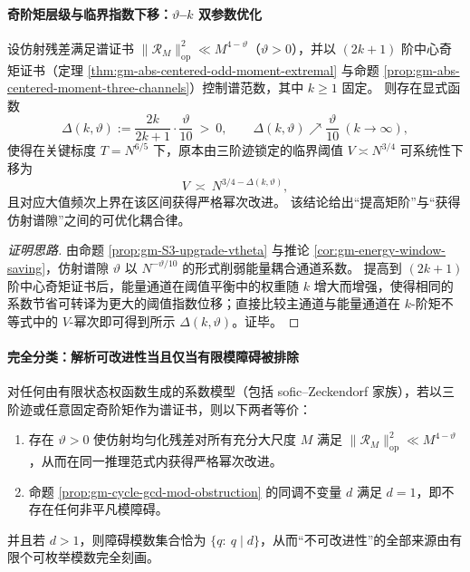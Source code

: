 \paragraph{奇阶矩层级与临界指数下移：\texorpdfstring{$\vartheta$}{vtheta}--\texorpdfstring{$k$}{k} 双参数优化}
\begin{proposition}\label{prop:gm-critical-exponent-shift-k-vtheta}
设仿射残差满足谱证书
\(
\|\mathcal{R}_M\|_{\mathrm{op}}^2\ll M^{4-\vartheta}
\)（\(\vartheta>0\)），并以 \((2k+1)\) 阶中心奇矩证书（定理 \ref{thm:gm-abs-centered-odd-moment-extremal} 与命题 \ref{prop:gm-abs-centered-moment-three-channels}）控制谱范数，其中 \(k\ge 1\) 固定。
则存在显式函数
\[
\Delta(k,\vartheta):=\frac{2k}{2k+1}\cdot\frac{\vartheta}{10}\ >\ 0,
\qquad
\Delta(k,\vartheta)\nearrow \frac{\vartheta}{10}\ (k\to\infty),
\]
使得在关键标度 \(T=N^{6/5}\) 下，原本由三阶迹锁定的临界阈值 \(V\asymp N^{3/4}\) 可系统性下移为
\[
V\ \asymp\ N^{3/4-\Delta(k,\vartheta)},
\]
且对应大值频次上界在该区间获得严格幂次改进。
该结论给出“提高矩阶”与“获得仿射谱隙”之间的可优化耦合律。
\end{proposition}

\begin{proof}[证明思路]
由命题 \ref{prop:gm-S3-upgrade-vtheta} 与推论 \ref{cor:gm-energy-window-saving}，仿射谱隙 \(\vartheta\) 以 \(N^{-\vartheta/10}\) 的形式削弱能量耦合通道系数。
提高到 \((2k+1)\) 阶中心奇矩证书后，能量通道在阈值平衡中的权重随 \(k\) 增大而增强，使得相同的系数节省可转译为更大的阈值指数位移；直接比较主通道与能量通道在 \(k\)-阶矩不等式中的 \(V\)-幂次即可得到所示 \(\Delta(k,\vartheta)\)。证毕。
\end{proof}

\paragraph{完全分类：解析可改进性当且仅当有限模障碍被排除}
\begin{theorem}\label{thm:gm-improvability-iff-d1}
对任何由有限状态权函数生成的系数模型（包括 sofic--Zeckendorf 家族），若以三阶迹或任意固定奇阶矩作为谱证书，则以下两者等价：
\begin{enumerate}
  \item 存在 \(\vartheta>0\) 使仿射均匀化残差对所有充分大尺度 \(M\) 满足
  \(
  \|\mathcal{R}_M\|_{\mathrm{op}}^2\ll M^{4-\vartheta}
  \)，从而在同一推理范式内获得严格幂次改进。
  \item 命题 \ref{prop:gm-cycle-gcd-mod-obstruction} 的同调不变量 \(d\) 满足 \(d=1\)，即不存在任何非平凡模障碍。
\end{enumerate}
并且若 \(d>1\)，则障碍模数集合恰为 \(\{q:\ q\mid d\}\)，从而“不可改进性”的全部来源由有限个可枚举模数完全刻画。
\end{theorem}

